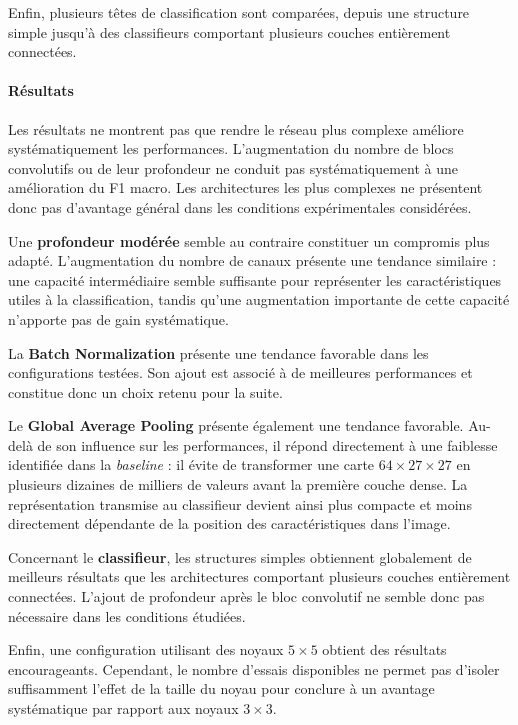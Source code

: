 Enfin, plusieurs têtes de classification sont comparées, depuis une structure simple jusqu'à des classifieurs comportant plusieurs couches entièrement connectées.

\paragraph{Résultats}

Les résultats ne montrent pas que rendre le réseau plus complexe améliore systématiquement les performances.
L'augmentation du nombre de blocs convolutifs ou de leur profondeur ne conduit pas systématiquement à une amélioration du F1 macro.
Les architectures les plus complexes ne présentent donc pas d'avantage général dans les conditions expérimentales considérées.

Une \textbf{profondeur modérée} semble au contraire constituer un compromis plus adapté.
L'augmentation du nombre de canaux présente une tendance similaire : une capacité intermédiaire semble suffisante pour représenter les caractéristiques utiles à la classification, tandis qu'une augmentation importante de cette capacité n'apporte pas de gain systématique.

La \textbf{Batch Normalization} présente une tendance favorable dans les configurations testées.
Son ajout est associé à de meilleures performances et constitue donc un choix retenu pour la suite.

Le \textbf{Global Average Pooling} présente également une tendance favorable.
Au-delà de son influence sur les performances, il répond directement à une faiblesse identifiée dans la \emph{baseline} : il évite de transformer une carte $64\times27\times27$ en plusieurs dizaines de milliers de valeurs avant la première couche dense.
La représentation transmise au classifieur devient ainsi plus compacte et moins directement dépendante de la position des caractéristiques dans l'image.

Concernant le \textbf{classifieur}, les structures simples obtiennent globalement de meilleurs résultats que les architectures comportant plusieurs couches entièrement connectées.
L'ajout de profondeur après le bloc convolutif ne semble donc pas nécessaire dans les conditions étudiées.

Enfin, une configuration utilisant des noyaux $5\times5$ obtient des résultats encourageants.
Cependant, le nombre d'essais disponibles ne permet pas d'isoler suffisamment l'effet de la taille du noyau pour conclure à un avantage systématique par rapport aux noyaux $3\times3$.

